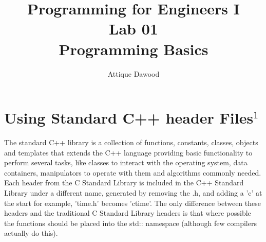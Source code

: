 \documentclass[12pt,a4paper]{article}
\title{\vspace{-2cm}Programming for Engineers I\\Lab 01\\Programming Basics}
\author{Attique Dawood}
\begin{document}
\maketitle
\section{Using Standard C++ header Files$^1$}
The standard C++ library is a collection of functions, constants, classes, objects and templates that extends the C++ language providing basic functionality to perform several tasks, like classes to interact with the operating system, data containers, manipulators to operate with them and algorithms commonly needed.\\
Each header from the C Standard Library is included in the C++ Standard Library under a different name, generated by removing the .h, and adding a 'c' at the start for example, 'time.h' becomes 'ctime'. The only difference between these headers and the traditional C Standard Library headers is that where possible the functions should be placed into the std:: namespace (although few compilers actually do this).\\
\end{document}
